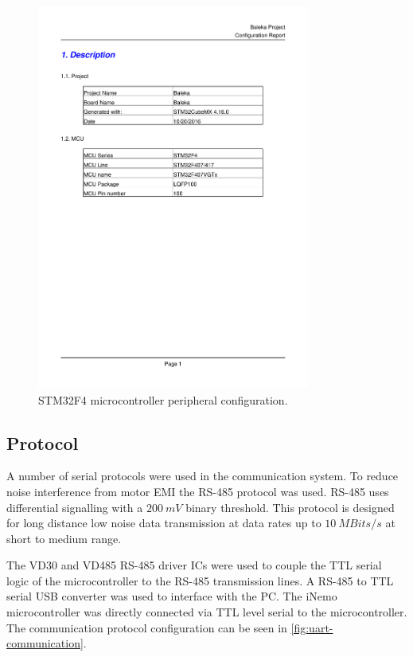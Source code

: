 \begin{figure}
\centering
\includegraphics[clip, trim=1cm 7cm 1cm 7cm, page = 2, width=0.8\textwidth]{pdfs/BalekaSTMConfig.pdf} 
\caption{STM32F4 microcontroller peripheral configuration.}
\label{fig:microcontroller-peripheral-config}
\end{figure}

\subsection{Protocol}

A number of serial protocols were used in the communication system. To reduce noise interference from motor EMI the RS-485 protocol was used. RS-485 uses differential signalling with a $200\ mV$ binary threshold. This protocol is designed for long distance low noise data transmission at data rates up to $10\ MBits/s$ at short to medium range. 

The VD30 and VD485 RS-485 driver ICs were used to couple the TTL serial logic of the microcontroller to the RS-485 transmission lines. A RS-485 to TTL serial USB converter was used to interface with the PC. The iNemo microcontroller was directly connected via TTL level serial to the microcontroller. The communication protocol configuration can be seen in \cref{fig:uart-communication}.

